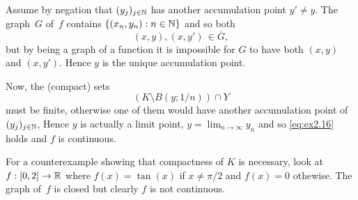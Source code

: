 \begin{enumerate}
Assume by negation that  \((y_j)_{j\in\mathbb{N}}\) has 
another accumulation point \(y' \neq y\).
The graph~$G$ of~$f$ contains \(\{(x_n,y_n):n\in\mathbb{N}\}\)
and so both 
\begin{equation*}
(x,y),(x,y') \,\in \overline{G},
\end{equation*}
but by being a graph of a function it is impossible for $G$
to have both \((x,y)\) and \((x,y')\). 
Hence $y$ is the unique accumulation point.

Now, the (compact) sets 
\begin{equation*}
\left(K\setminus B(y;1/n)\right)\cap Y
\end{equation*}
must be finite, otherwise one of them would have another accumulation point
of \((y_j)_{j\in\mathbb{N}}\),
Hence $y$ is actually a limit point, \(y=\lim_{n\to\infty} y_n\)
and so \eqref{eq:ex2.16} holds and $f$ is continuous.


For a counterexample showing that compactness of $K$ is necessary,
look at \(f:[0,2]\to \mathbb{R}\) where \(f(x)=\tan(x)\) if \(x\neq \pi/2\)
and \(f(x)=0\) othewise. The graph of~$f$ is closed but clearly $f$
is not continuous.

\end{enumerate}
